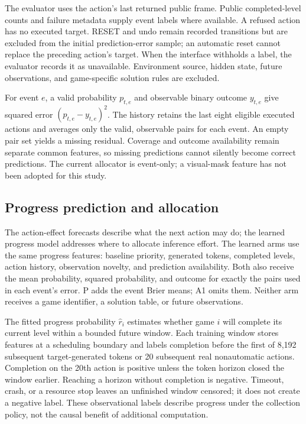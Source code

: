 \documentclass[11pt]{article}
\begin{document}
The evaluator uses the action's last returned public frame. Public completed-level counts and failure metadata supply event labels where available. A refused action has no executed target. RESET and undo remain recorded transitions but are excluded from the initial prediction-error sample; an automatic reset cannot replace the preceding action's target. When the interface withholds a label, the evaluator records it as unavailable. Environment source, hidden state, future observations, and game-specific solution rules are excluded.

For event $e$, a valid probability $p_{t,e}$ and observable binary outcome $y_{t,e}$ give squared error $(p_{t,e}-y_{t,e})^2$. The history retains the last eight eligible executed actions and averages only the valid, observable pairs for each event. An empty pair set yields a missing residual. Coverage and outcome availability remain separate common features, so missing predictions cannot silently become correct predictions. The current allocator is event-only; a visual-mask feature has not been adopted for this study.

\subsection{Progress prediction and allocation}
The action-effect forecasts describe what the next action may do; the learned progress model addresses where to allocate inference effort. The learned arms use the same progress features: baseline priority, generated tokens, completed levels, action history, observation novelty, and prediction availability. Both also receive the mean probability, squared probability, and outcome for exactly the pairs used in each event's error. P adds the event Brier means; A1 omits them. Neither arm receives a game identifier, a solution table, or future observations.

The fitted progress probability $\hat r_i$ estimates whether game $i$ will complete its current level within a bounded future window. Each training window stores features at a scheduling boundary and labels completion before the first of 8,192 subsequent target-generated tokens or 20 subsequent real nonautomatic actions. Completion on the 20th action is positive unless the token horizon closed the window earlier. Reaching a horizon without completion is negative. Timeout, crash, or a resource stop leaves an unfinished window censored; it does not create a negative label. These observational labels describe progress under the collection policy, not the causal benefit of additional computation.
\end{document}
